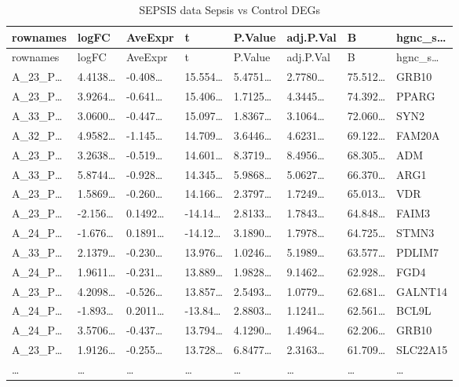\documentclass[
]{article}
\begin{document}
\begin{longtable}[]{@{}llllllll@{}}
\caption{\label{tab:SEPSIS-data-Sepsis-vs-Control-DEGs}SEPSIS data Sepsis vs Control DEGs}\tabularnewline
\toprule
rownames & logFC & AveExpr & t & P.Value & adj.P.Val & B & hgnc\_s\ldots{}\tabularnewline
\midrule
\endfirsthead
\toprule
rownames & logFC & AveExpr & t & P.Value & adj.P.Val & B & hgnc\_s\ldots{}\tabularnewline
\midrule
\endhead
A\_23\_P\ldots{} & 4.4138\ldots{} & -0.408\ldots{} & 15.554\ldots{} & 5.4751\ldots{} & 2.7780\ldots{} & 75.512\ldots{} & GRB10\tabularnewline
A\_23\_P\ldots{} & 3.9264\ldots{} & -0.641\ldots{} & 15.406\ldots{} & 1.7125\ldots{} & 4.3445\ldots{} & 74.392\ldots{} & PPARG\tabularnewline
A\_33\_P\ldots{} & 3.0600\ldots{} & -0.447\ldots{} & 15.097\ldots{} & 1.8367\ldots{} & 3.1064\ldots{} & 72.060\ldots{} & SYN2\tabularnewline
A\_32\_P\ldots{} & 4.9582\ldots{} & -1.145\ldots{} & 14.709\ldots{} & 3.6446\ldots{} & 4.6231\ldots{} & 69.122\ldots{} & FAM20A\tabularnewline
A\_23\_P\ldots{} & 3.2638\ldots{} & -0.519\ldots{} & 14.601\ldots{} & 8.3719\ldots{} & 8.4956\ldots{} & 68.305\ldots{} & ADM\tabularnewline
A\_33\_P\ldots{} & 5.8744\ldots{} & -0.928\ldots{} & 14.345\ldots{} & 5.9868\ldots{} & 5.0627\ldots{} & 66.370\ldots{} & ARG1\tabularnewline
A\_23\_P\ldots{} & 1.5869\ldots{} & -0.260\ldots{} & 14.166\ldots{} & 2.3797\ldots{} & 1.7249\ldots{} & 65.013\ldots{} & VDR\tabularnewline
A\_23\_P\ldots{} & -2.156\ldots{} & 0.1492\ldots{} & -14.14\ldots{} & 2.8133\ldots{} & 1.7843\ldots{} & 64.848\ldots{} & FAIM3\tabularnewline
A\_24\_P\ldots{} & -1.676\ldots{} & 0.1891\ldots{} & -14.12\ldots{} & 3.1890\ldots{} & 1.7978\ldots{} & 64.725\ldots{} & STMN3\tabularnewline
A\_33\_P\ldots{} & 2.1379\ldots{} & -0.230\ldots{} & 13.976\ldots{} & 1.0246\ldots{} & 5.1989\ldots{} & 63.577\ldots{} & PDLIM7\tabularnewline
A\_24\_P\ldots{} & 1.9611\ldots{} & -0.231\ldots{} & 13.889\ldots{} & 1.9828\ldots{} & 9.1462\ldots{} & 62.928\ldots{} & FGD4\tabularnewline
A\_23\_P\ldots{} & 4.2098\ldots{} & -0.526\ldots{} & 13.857\ldots{} & 2.5493\ldots{} & 1.0779\ldots{} & 62.681\ldots{} & GALNT14\tabularnewline
A\_24\_P\ldots{} & -1.893\ldots{} & 0.2011\ldots{} & -13.84\ldots{} & 2.8803\ldots{} & 1.1241\ldots{} & 62.561\ldots{} & BCL9L\tabularnewline
A\_24\_P\ldots{} & 3.5706\ldots{} & -0.437\ldots{} & 13.794\ldots{} & 4.1290\ldots{} & 1.4964\ldots{} & 62.206\ldots{} & GRB10\tabularnewline
A\_23\_P\ldots{} & 1.9126\ldots{} & -0.255\ldots{} & 13.728\ldots{} & 6.8477\ldots{} & 2.3163\ldots{} & 61.709\ldots{} & SLC22A15\tabularnewline
\ldots{} & \ldots{} & \ldots{} & \ldots{} & \ldots{} & \ldots{} & \ldots{} & \ldots{}\tabularnewline
\bottomrule
\end{longtable}
\end{document}
